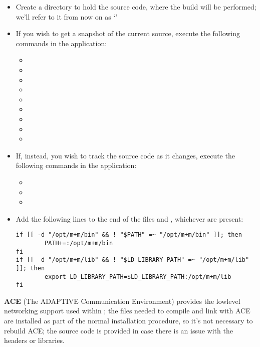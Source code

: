 \begin{itemize}
\item Create a directory to hold the source code, where the build will be performed; we'll
refer to it from now on as `'
\item\exSp{}If you wish to get a snapshot of the current source, execute the following
commands in the  application:
\begin{itemize}
\item {}
\item\exSp{}
\item\exSp{}
\item\exSp{}
\item\exSp{}
\item\exSp{}
\item\exSp{}
\item\exSp{}
\item\exSp{}
\end{itemize}
\item\exSp{}If, instead, you wish to track the source code as it changes, execute the
following commands in the  application:
\begin{itemize}
\item {}
\item\exSp{}
\item\exSp{}
\end{itemize}
\item\exSp{}Add the following lines to the end of the files
 and ,
whichever are present:
\begin{verbatim}
if [[ -d "/opt/m+m/bin" && ! "$PATH" =~ "/opt/m+m/bin" ]]; then
        PATH+=:/opt/m+m/bin
fi
if [[ -d "/opt/m+m/lib" && ! "$LD_LIBRARY_PATH" =~ "/opt/m+m/lib" ]]; then
        export LD_LIBRARY_PATH=$LD_LIBRARY_PATH:/opt/m+m/lib
fi
\end{verbatim}
\end{itemize}
\tertiaryEnd
\secondaryEnd
{}
\textbf{ACE} (The ADAPTIVE Communication Environment) provides the low\longDash{}level
networking support used within \mplusm{}; the files needed to compile and link with ACE
are installed as part of the normal \mplusm{} installation procedure, so it's not
necessary to rebuild ACE; the source code is provided in case there is an issue with the
headers or libraries.\\

